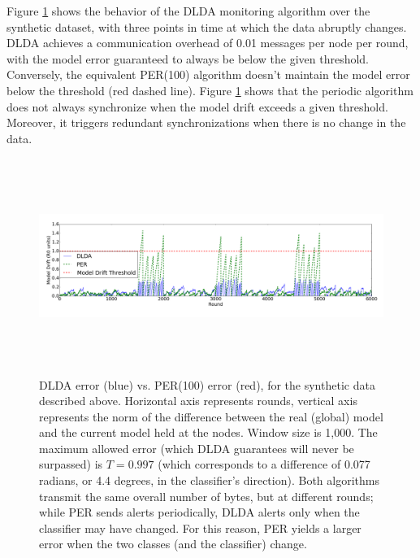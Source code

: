 Figure \ref{PERvsDLDAoverTime} shows the behavior of the DLDA monitoring
algorithm over the synthetic dataset, with three points in time at which the data abruptly changes. 
DLDA achieves a communication overhead of 0.01 messages per node per round, with the model error guaranteed to always be below the given threshold.
Conversely, the equivalent PER(100) algorithm doesn't maintain the
model error below the threshold (red dashed line).
Figure \ref{PERvsDLDAoverTime} shows that the periodic algorithm does not always 
synchronize when the model drift exceeds a given threshold. 
Moreover, it triggers redundant synchronizations when there is no change in the data.
\begin{figure}[ht]
	\centering
	\includegraphics[width=\textwidth, height=7cm]{graphics/LDA/PERvsDLDAoverTime.png}
	\caption{DLDA error (blue) vs. PER(100) error (red), for the synthetic
	data described above. Horizontal axis represents rounds, vertical
	axis represents the norm of the difference between the real (global) model and the current model held at the nodes. Window size is 1,000.
	The maximum allowed error (which DLDA guarantees will never be
	surpassed) is $T = 0.997$ (which corresponds to a difference of
	0.077 radians, or 4.4 degrees, in the classifier's direction). Both
	algorithms transmit the same overall number of bytes, but at different
	rounds; while PER sends alerts periodically, DLDA alerts only when the classifier may have changed. For this reason, PER yields a larger
	error when the two classes (and the classifier) change.
}
	\label{PERvsDLDAoverTime}
\end{figure}
%
%
